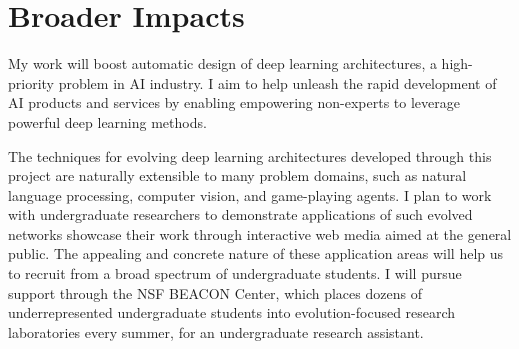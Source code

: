 \section{Broader Impacts}

My work will boost automatic design of deep learning architectures, a high-priority problem in AI industry.
I aim to help unleash the rapid development of AI products and services by enabling empowering non-experts to leverage powerful deep learning methods.

The techniques for evolving deep learning architectures developed through this project are naturally extensible to many problem domains, such as natural language processing, computer vision, and game-playing agents.
I plan to work with undergraduate researchers to demonstrate applications of such evolved networks showcase their work through interactive web media aimed at the general public.
The appealing and concrete nature of these application areas will help us to recruit from a broad spectrum of undergraduate students.
I will pursue support through the NSF BEACON Center, which places dozens of underrepresented undergraduate students into evolution-focused research laboratories every summer, for an undergraduate research assistant.
